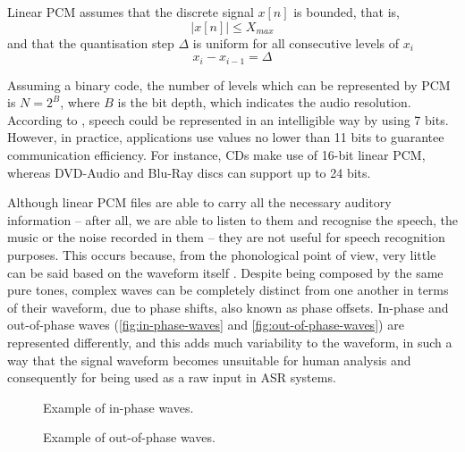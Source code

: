 Linear PCM assumes that the discrete signal $x[n]$ is bounded, that is,
\begin{equation}
|x[n]| \leq X_{max} 
\end{equation}
and that the quantisation step $\Delta$ is uniform for all consecutive levels of $x_i$
\begin{equation}
x_i - x_{i-1} = \Delta
\end{equation}

Assuming a binary code, the number of levels which can be represented by PCM is $N=2^B$, where $B$ is the bit depth, which indicates
the audio resolution. According to \citep{Huang2001}, speech could be represented in an intelligible way by using 7 bits. However, in 
practice, applications use values no lower than 11 bits to guarantee communication efficiency. For instance, CDs make use of 16-bit 
linear PCM, whereas DVD-Audio and Blu-Ray discs can support up to 24 bits.

Although linear PCM files are able to carry all the necessary auditory information -- after all, we are able to listen to them and
recognise the speech, the music or the noise recorded in them -- they are not useful for speech recognition purposes. This occurs 
because, from the phonological point of view, very little can be said based on the waveform itself \citep{Shrawankar2010}. Despite being composed by the same pure tones, complex waves can be completely distinct from one another in terms of their waveform, due to phase shifts, also known as phase offsets. In-phase and out-of-phase waves (\autoref{fig:in-phase-waves} and
\autoref{fig:out-of-phase-waves}) are represented differently, and this adds much variability to the waveform, in such a way that
the signal waveform becomes unsuitable for human analysis and consequently for being used as a raw input in \ac{ASR} systems. 

\begin{figure}[!ht]
        \noindent{}
        \caption{Example of in-phase waves.}
        \label{fig:in-phase-waves}
\end{figure}

\begin{figure}[!ht]
        \noindent{}
        \caption{Example of out-of-phase waves.}
        \label{fig:out-of-phase-waves}
\end{figure}

